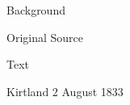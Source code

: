 			\begin{description}
				\item[Background]
			\end{description}
			
			
			\begin{description}
				\item[Original Source]
			\end{description}
			
			
			\begin{description}
				\item[Text]
			\end{description}
			
				\begin{tightcenter}
				Kirtland 2 August 1833
				\end{tightcenter}
				
